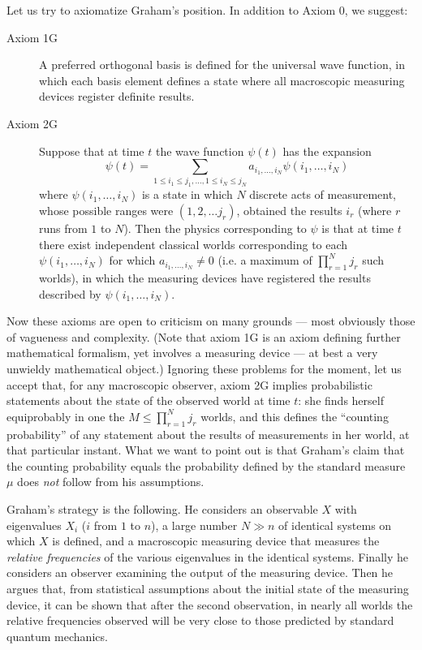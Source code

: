 \documentclass[aps,pra,12pt]{revtex4}
\begin{document}
Let us try to axiomatize Graham's position.  In addition to Axiom 0, we 
suggest:
\begin{description}
\item[Axiom 1G] A preferred orthogonal 
basis is defined for the universal wave function,
in which each basis element defines a state 
where all macroscopic measuring devices register definite results.  

\item[Axiom 2G]
Suppose that at time $t$ the wave function $\psi(t)$ has the expansion 
\begin{equation}
\psi(t) = \sum_{1 \leq i_1 \leq j_1 , \ldots , 1 \leq i_N \leq j_N} 
a_{i_1 , \ldots , i_N} \psi (i_1 , \ldots , i_N )
\end{equation}
where $\psi (i_1 , \ldots , i_N )$ is a state in which $N$ discrete
acts of measurement, whose possible ranges were $(1,2, \ldots j_r)$, 
obtained the results $i_r$ (where $r$ runs from $1$ to $N$). 
Then the physics corresponding to $\psi$ is that at time $t$ there 
exist independent classical worlds corresponding to each 
$\psi (i_1 , \ldots , i_N )$ for which $a_{i_1 , \ldots , i_N} \neq 0$
(i.e. a maximum of $\prod_{r=1}^N  j_r$ such worlds), in which the 
measuring devices have registered the results described 
by $\psi (i_1 , \ldots , i_N )$. 
\end{description}

Now these axioms are open to criticism on many grounds --- most obviously
those of vagueness and complexity. (Note that axiom 1G is an axiom defining
further mathematical formalism, yet involves a measuring device --- at best
a very unwieldy mathematical object.)
Ignoring these problems for the moment,
let us accept that, for any macroscopic observer, axiom 2G implies
probabilistic statements about the state of the observed world at time $t$:
she finds herself equiprobably in one the $M \leq \prod_{r=1}^N  j_r$ worlds,
and this defines the ``counting probability'' of any statement about 
the results of measurements in her world, at that particular instant. 
What we want to point out is that Graham's claim that the counting
probability equals the probability defined by the standard measure $\mu$ 
does {\em not} follow from his assumptions.

Graham's strategy is the following.  
He considers an observable $X$ with eigenvalues $X_i$ ($i$ from $1$ to $n$),
a large number $N \gg n$ of identical systems on which $X$ is defined,
and a macroscopic measuring device that measures the 
{\em relative frequencies} of the various eigenvalues in the identical
systems. 
Finally he considers an observer examining the output of the measuring device.
Then he argues that, from statistical assumptions about the initial state
of the measuring device, it can be shown that after the second observation,
in nearly all worlds 
the relative frequencies observed will be very close to those predicted by
standard quantum mechanics. 
\end{document}
